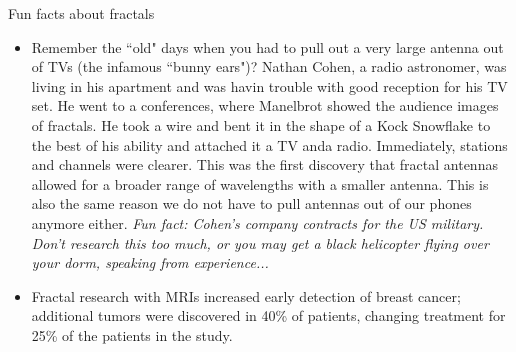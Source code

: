 \documentclass{ximera}
\begin{document}
Fun facts about fractals
\begin{itemize}
    \item Remember the ``old" days when you had to pull out a very large antenna out of TVs (the infamous ``bunny ears")?  Nathan Cohen, a radio astronomer, was living in his apartment and was havin trouble with good reception for his TV set.  He went to a conferences, where Manelbrot showed the audience images of fractals.  He took a wire and bent it in the shape of a Kock Snowflake to the best of his ability and attached it a TV anda  radio.  Immediately, stations and channels were clearer. This was the first discovery that fractal antennas allowed for a broader range of wavelengths with a smaller antenna.  This is also the same reason we do not have to pull antennas out of our phones anymore either.  \textit{Fun fact: Cohen's company contracts for the US military.  Don't research this too much, or you may get a black helicopter flying over your dorm, speaking from experience...}
    \item Fractal research with MRIs increased early detection of breast cancer; additional tumors were discovered in 40\% of patients, changing treatment for 25\% of the patients in the study.
\end{itemize}
\end{document}
